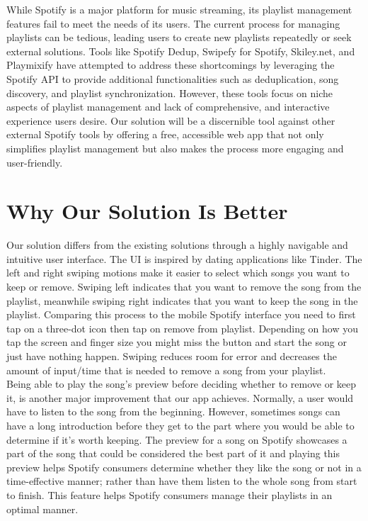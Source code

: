 \documentclass{article}
\begin{document}
While Spotify is a major platform for music streaming, its playlist management features fail to meet the needs of its users. The current process for managing playlists can be tedious, leading users to create new playlists repeatedly or seek external solutions. Tools like Spotify Dedup, Swipefy for Spotify, Skiley.net, and Playmixify have attempted to address these shortcomings by leveraging the Spotify API to provide additional functionalities such as deduplication, song discovery, and playlist synchronization. However, these tools focus on niche aspects of playlist management and lack of comprehensive, and interactive experience users desire. Our solution will be a discernible tool against other external Spotify tools by offering a free, accessible web app that not only simplifies playlist management but also makes the process more engaging and user-friendly.
 

\section{Why Our Solution Is Better}
\quad Our solution differs from the existing solutions through a highly navigable and intuitive user interface. The UI is inspired by dating applications like Tinder. The left and right swiping motions make it easier to select which songs you want to keep or remove. Swiping left indicates that you want to remove the song from the playlist, meanwhile swiping right indicates that you want to keep the song in the playlist. Comparing this process to the mobile Spotify interface you need to first tap on a three-dot icon then tap on remove from playlist. Depending on how you tap the screen and finger size you might miss the button and start the song or just have nothing happen. Swiping reduces room for error and decreases the amount of input/time that is needed to remove a song from your playlist.
\\

\quad Being able to play the song’s preview before deciding whether to remove or keep it, is another major improvement that our app achieves. Normally, a user would have to listen to the song from the beginning. However, sometimes songs can have a long introduction before they get to the part where you would be able to determine if it’s worth keeping. The preview for a song on Spotify showcases a part of the song that could be considered the best part of it and playing this preview helps Spotify consumers determine whether they like the song or not in a time-effective manner; rather than have them listen to the whole song from start to finish. This feature helps Spotify consumers manage their playlists in an optimal manner.
\\
\end{document}
